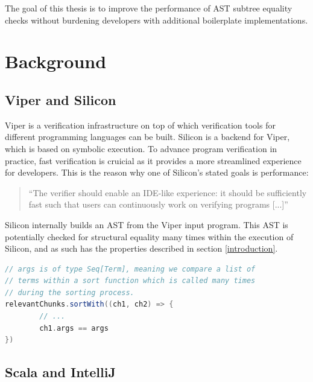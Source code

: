 \documentclass[11pt]{article}
\begin{document}
    The goal of this thesis is to improve the performance of AST subtree equality checks
    without burdening developers with additional boilerplate implementations.
    
    \section{Background}

    \subsection{Viper and Silicon} \label{background:viper}
    
    Viper \cite{viper} is a verification infrastructure on top of which verification tools
    for different programming languages can be built. Silicon \cite{silicon} is a backend for Viper,
    which is based on symbolic execution. To advance program verification in practice,
    fast verification is cruicial as it provides a more streamlined experience for developers.
    This is the reason why one of Silicon's stated goals is performance:

    \begin{quote} 
        ``The verifier should enable an IDE-like experience: it should be
        sufficiently fast such that users can continuously work on verifying
        programs [...]'' \cite{silicon}
    \end{quote}

    Silicon internally builds an AST from the Viper input
    program. This AST is potentially checked for structural equality many times within
    the execution of Silicon, and as such has the properties described in section \ref{introduction}.

    \begin{lstlisting}[language=Scala, caption=Example of multiple subtree (``term'') equality checks occuring during the execution of Silicon.]
// args is of type Seq[Term], meaning we compare a list of
// terms within a sort function which is called many times
// during the sorting process.
relevantChunks.sortWith((ch1, ch2) => {
        // ...
        ch1.args == args
})
    \end{lstlisting}

    \subsection{Scala and IntelliJ} \label{background:scala}
\end{document}
